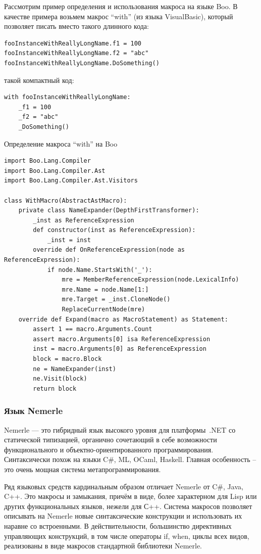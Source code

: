 \documentclass[a4paper,12pt]{article}
\begin{document}
Рассмотрим пример определения и использования макроса на языке Boo. В качестве
примера возьмем макрос ``with'' (из языка VisualBasic), который позволяет писать
вместо такого длинного кода:
\begin{verbatim}
fooInstanceWithReallyLongName.f1 = 100
fooInstanceWithReallyLongName.f2 = "abc"
fooInstanceWithReallyLongName.DoSomething()
\end{verbatim}
такой компактный код:
\begin{verbatim}
with fooInstanceWithReallyLongName:
    _f1 = 100
    _f2 = "abc"
    _DoSomething()
\end{verbatim}

\begin{example}
Определение макроса ``with'' на Boo
\end{example}
\begin{verbatim}
import Boo.Lang.Compiler
import Boo.Lang.Compiler.Ast
import Boo.Lang.Compiler.Ast.Visitors

class WithMacro(AbstractAstMacro):
    private class NameExpander(DepthFirstTransformer):
        _inst as ReferenceExpression
        def constructor(inst as ReferenceExpression):
            _inst = inst
        override def OnReferenceExpression(node as ReferenceExpression):
            if node.Name.StartsWith('_'):
                mre = MemberReferenceExpression(node.LexicalInfo)
                mre.Name = node.Name[1:]
                mre.Target = _inst.CloneNode()
                ReplaceCurrentNode(mre)
    override def Expand(macro as MacroStatement) as Statement:
        assert 1 == macro.Arguments.Count
        assert macro.Arguments[0] isa ReferenceExpression
        inst = macro.Arguments[0] as ReferenceExpression
        block = macro.Block
        ne = NameExpander(inst)
        ne.Visit(block)
        return block
\end{verbatim}

\subsubsection*{Язык Nemerle}
Nemerle — это гибридный язык высокого уровня для платформы~.NET со статической
типизацией, органично сочетающий в себе возможности функционального и
объектно-ориентированного программирования. Синтаксически похож на языки C\#,
ML, OCaml, Haskell. Главная особенность -- это очень мощная система
метапрограммирования.

Ряд языковых средств кардинальным образом отличает Nemerle от C\#, Java, C++.
Это макросы и замыкания, причём в виде, более характерном для Lisp или других
функциональных языков, нежели для С++. Система макросов позволяет описывать на
Nemerle новые синтаксические конструкции и использовать их наравне со
встроенными. В действительности, большинство директивных управляющих
конструкций, в том числе операторы if, when, циклы всех видов, реализованы в
виде макросов стандартной библиотеки Nemerle.
\end{document}
